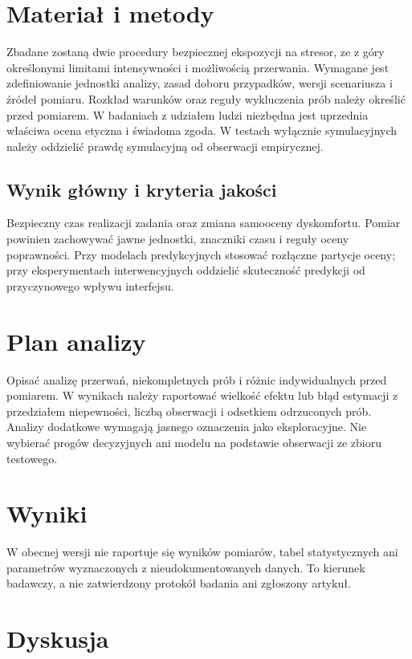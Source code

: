 \documentclass[11pt,a4paper]{article}
\begin{document}
\section{Materiał i metody}

Zbadane zostaną dwie procedury bezpiecznej ekspozycji na stresor, ze z góry określonymi limitami intensywności i możliwością przerwania. Wymagane jest zdefiniowanie jednostki analizy, zasad doboru przypadków, wersji scenariusza i źródeł pomiaru. Rozkład warunków oraz reguły wykluczenia prób należy określić przed pomiarem. W badaniach z udziałem ludzi niezbędna jest uprzednia właściwa ocena etyczna i świadoma zgoda. W testach wyłącznie symulacyjnych należy oddzielić prawdę symulacyjną od obserwacji empirycznej.

\subsection{Wynik główny i kryteria jakości}

Bezpieczny czas realizacji zadania oraz zmiana samooceny dyskomfortu. Pomiar powinien zachowywać jawne jednostki, znaczniki czasu i reguły oceny poprawności. Przy modelach predykcyjnych stosować rozłączne partycje oceny; przy eksperymentach interwencyjnych oddzielić skuteczność predykcji od przyczynowego wpływu interfejsu.

\section{Plan analizy}

Opisać analizę przerwań, niekompletnych prób i różnic indywidualnych przed pomiarem. W wynikach należy raportować wielkość efektu lub błąd estymacji z przedziałem niepewności, liczbą obserwacji i odsetkiem odrzuconych prób. Analizy dodatkowe wymagają jasnego oznaczenia jako eksploracyjne. Nie wybierać progów decyzyjnych ani modelu na podstawie obserwacji ze zbioru testowego.

\section{Wyniki}

W obecnej wersji nie raportuje się wyników pomiarów, tabel statystycznych ani parametrów wyznaczonych z nieudokumentowanych danych. To kierunek badawczy, a nie zatwierdzony protokół badania ani zgłoszony artykuł.

\section{Dyskusja}
\end{document}
